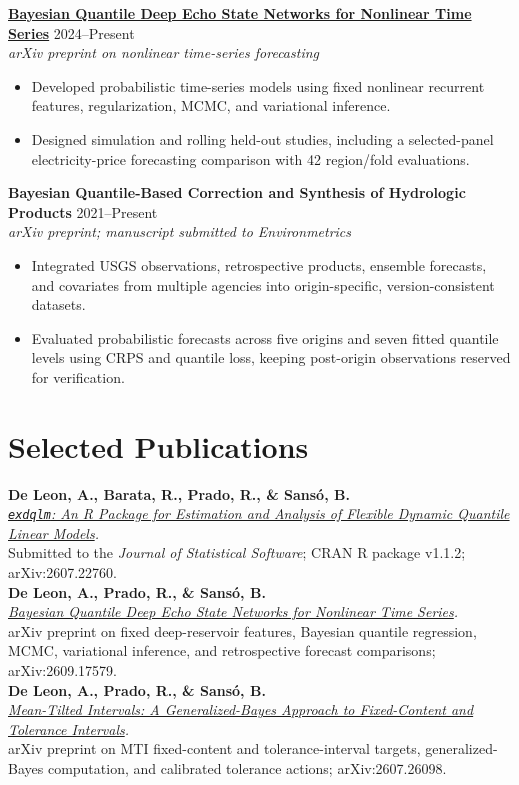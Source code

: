 \documentclass[10pt,letterpaper]{article}
\newcommand{\cvsection}[1]{%
  \Needspace{4\baselineskip}%
  \section*{#1}%
}
\newcommand{\projectentry}[3]{%
  \Needspace{5\baselineskip}%
  \textbf{#1} \hfill #2\\
  \textit{#3}\\[-2pt]
}
\newcommand{\publication}[3]{%
  \Needspace{3\baselineskip}%
  \textbf{#1}\\
  \textit{#2}\\
  #3\\[1pt]
}
\newcommand{\tightspace}{\vspace{1pt}}
\begin{document}
\projectentry{\href{https://arxiv.org/abs/2609.17579}{Bayesian Quantile Deep Echo State Networks for Nonlinear Time Series}}{2024--Present}{arXiv preprint on nonlinear time-series forecasting}
\begin{itemize}
  \item Developed probabilistic time-series models using fixed nonlinear recurrent features, regularization, MCMC, and variational inference.
  \item Designed simulation and rolling held-out studies, including a selected-panel electricity-price forecasting comparison with 42 region/fold evaluations.
\end{itemize}
\tightspace

\projectentry{Bayesian Quantile-Based Correction and Synthesis of Hydrologic Products}{2021--Present}{arXiv preprint; manuscript submitted to \textit{Environmetrics}}
\begin{itemize}
  \item Integrated USGS observations, retrospective products, ensemble forecasts, and covariates from multiple agencies into origin-specific, version-consistent datasets.
  \item Evaluated probabilistic forecasts across five origins and seven fitted quantile levels using CRPS and quantile loss, keeping post-origin observations reserved for verification.
\end{itemize}

\cvsection{Selected Publications}
\publication{De Leon, A., Barata, R., Prado, R., \& Sans\'o, B.}{\href{https://arxiv.org/abs/2607.22760}{\texttt{exdqlm}: An R Package for Estimation and Analysis of Flexible Dynamic Quantile Linear Models}.}{Submitted to the \textit{Journal of Statistical Software}; CRAN R package v1.1.2; arXiv:2607.22760.}

\publication{De Leon, A., Prado, R., \& Sans\'o, B.}{\href{https://arxiv.org/abs/2609.17579}{Bayesian Quantile Deep Echo State Networks for Nonlinear Time Series}.}{arXiv preprint on fixed deep-reservoir features, Bayesian quantile regression, MCMC, variational inference, and retrospective forecast comparisons; arXiv:2609.17579.}

\publication{De Leon, A., Prado, R., \& Sans\'o, B.}{\href{https://arxiv.org/abs/2607.26098}{Mean-Tilted Intervals: A Generalized-Bayes Approach to Fixed-Content and Tolerance Intervals}.}{arXiv preprint on MTI fixed-content and tolerance-interval targets, generalized-Bayes computation, and calibrated tolerance actions; arXiv:2607.26098.}
\end{document}
